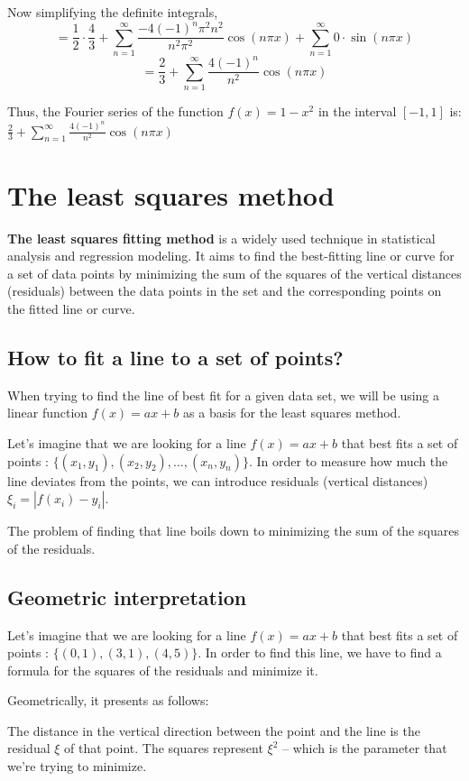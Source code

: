 \documentclass{MathematicaReport}
\begin{document}
Now simplifying the definite integrals,
\[ = \frac{1}{2} \cdot \frac{4}{3} + \sum_{n=1}^{\infty} \frac{-4(-1)^n\pi^2n^2}{n^2\pi^2} \cos(n\pi x) + \sum_{n=1}^{\infty} 0 \cdot \sin(n\pi x) \]
\[ = \frac{2}{3} + \sum_{n=1}^{\infty} \frac{4(-1)^n}{n^2} \cos(n\pi x) \]

Thus, the Fourier series of the function $f(x)=1-x^2$ in the interval 
$[-1,1]$ is: $\frac{2}{3} + \sum_{n=1}^{\infty} \frac{4(-1)^n}{n^2} \cos(n\pi x)$

\section{The least squares method}
\textbf{The least squares fitting method} is a widely used technique in statistical
analysis and regression modeling. It aims to find the best-fitting line or curve
for a set of data points by minimizing the sum of the squares of the
vertical distances (residuals) between the data points in the set and the
corresponding points on the fitted line or curve. 

\subsection{How to fit a line to a set of points?}
When trying to find the line of best fit for a given data set, we will be using
a linear function \( f(x) = ax + b \)  as a basis for the least squares method.

Let's imagine that we are looking for a line \( f(x) = ax + b \) that best fits 
a set of points : \( \{(x_1,y_1), (x_2,y_2),\ldots,(x_n,y_n)\} \). 
In order to measure how much the line deviates from the points, we can introduce
residuals (vertical distances) \( \xi_i = | f(x_i) - y_i |  \). 

The problem of finding that line boils down to minimizing the sum of the 
squares of the residuals.

\subsection{Geometric interpretation}
Let's imagine that we are looking for a line \( f(x) = ax + b \) that best fits 
a set of points : \( \{(0,1), (3,1), (4,5)\} \). In order to find this line,
we have to find a formula for the squares of the residuals and minimize it.

Geometrically, it presents as follows:
\begin{center}
	
\end{center}
The distance in the vertical direction between the point and the line is the 
residual \( \xi \) of that point. The squares represent \( \xi^2 \) -- which is
the parameter that we're trying to minimize.
\end{document}

